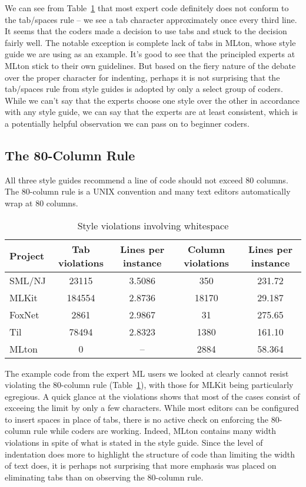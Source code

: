\documentclass[12pt,abstracton]{scrartcl}
\begin{document}
We can see from Table~\ref{table:whitespace} that most expert code definitely does
not conform to the tab/spaces rule -- we see a tab character approximately once every third line.
It seems that the coders made a decision to use tabs and stuck to the decision fairly well.
The notable exception is complete lack of tabs in MLton, whose style guide we are using as an example.
It's good to see that the principled experts at MLton stick to their own guidelines.
But based on the fiery nature of the debate over the proper character
for indenting, perhaps it is not surprising that the tab/spaces
rule from style guides is adopted by only a select group of coders.
While we can't say that the experts choose one style over the other in accordance with
any style guide, we can say that the experts are at least consistent, which is
a potentially helpful observation we can pass on to beginner coders.
\subsection{The 80-Column Rule}\label{subsec:80}
All three style guides recommend a line of code should not exceed 80 columns.
The 80-column rule is a UNIX convention and many text editors automatically
wrap at 80 columns. \cite{Cmu12}

\begin{table}[t!]
\centering
\begin{tabular}{|l||c|c||c|c|}
\hline
Project & Tab violations & Lines per instance & Column violations & Lines per instance \\ \hline\hline
SML/NJ & 23115 & 3.5086 & 350 & 231.72 \\
MLKit & 184554 & 2.8736 & 18170 & 29.187 \\
FoxNet & 2861 & 2.9867 & 31 & 275.65 \\
Til & 78494 & 2.8323 & 1380 & 161.10 \\
MLton & 0 & -- & 2884 & 58.364 \\ \hline
\end{tabular}
\caption{Style violations involving whitespace}
\label{table:whitespace}
\end{table}

The example code from the expert ML users we looked at clearly cannot
resist violating the 80-column rule (Table~\ref{table:whitespace}), with
those for MLKit being particularly egregious. A quick glance
at the violations shows that most of the cases consist of exceeing the limit
by only a few characters. While most editors can be configured to insert
spaces in place of tabs, there is no active check on enforcing the 80-column
rule while coders are working.
Indeed, MLton contains many width violations in spite of what is stated in the style guide.
Since the level of indentation does more to highlight the structure of code than
limiting the width of text does, it is perhaps not surprising that more
emphasis was placed on eliminating tabs than on observing the 80-column rule.
\end{document}
